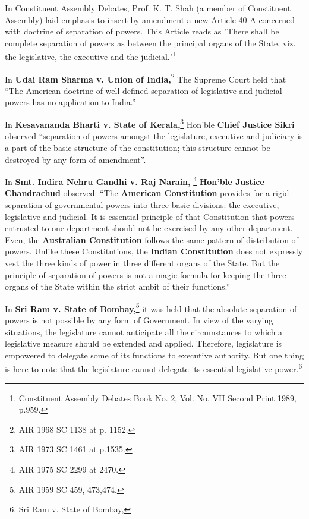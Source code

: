 \begin{multicols}{2}
\noi
In Constituent Assembly Debates, Prof. K. T. Shah (a member of Constituent Assembly) laid
emphasis to insert by amendment a new Article 40-A concerned with doctrine of separation of
powers. This Article reads as "There shall be complete separation of powers as between the
principal organs of the State, viz. the legislative, the executive and the judicial."\footnote{Constituent Assembly Debates Book No. 2, Vol. No. VII Second Print 1989, p.959.}

\noi
In \textbf{Udai Ram Sharma v. Union of India,}\footnote{AIR 1968 SC 1138 at p. 1152.} The Supreme Court held that “The American doctrine of well-defined separation of legislative and judicial powers has no application to India.”

\noi
In \textbf{Kesavananda Bharti v. State of Kerala,}\footnote{AIR 1973 SC 1461 at p.1535.} Hon'ble \textbf{Chief Justice Sikri} observed “separation of powers amongst the legislature, executive and judiciary is a part of the basic structure of the constitution; this structure cannot be destroyed by any form of amendment”.

\noi
In \textbf{Smt. Indira Nehru Gandhi v. Raj Narain,} \footnote{AIR 1975 SC 2299 at 2470.} \textbf{Hon'ble Justice Chandrachud} observed: “The \textbf{American Constitution} provides for a rigid separation of governmental powers into three basic divisions: the executive, legislative and judicial. It is essential principle of that Constitution that powers entrusted to one department should not be exercised by any other department. Even, the \textbf{Australian Constitution} follows the same pattern of distribution of powers. Unlike these Constitutions, the \textbf{Indian Constitution} does not expressly vest the three kinds of power in three different organs of the State. But the principle of separation of powers is not a magic formula for keeping the three organs of the State within the strict ambit of their functions.”

\noi
In \textbf{Sri Ram v. State of Bombay,}\footnote{AIR 1959 SC 459, 473,474.} it was held that the absolute separation of powers is not possible by any form of Government. In view of the varying situations, the legislature cannot anticipate all the circumstances to which a legislative measure should be extended and applied.
Therefore, legislature is empowered to delegate some of its functions to executive authority. But
one thing is here to note that the legislature cannot delegate its essential legislative power.\footnote{Sri Ram v. State of Bombay,}


\end{multicols}
